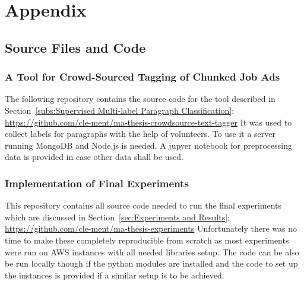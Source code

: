 
\renewcommand{\theequation}{B\arabic{equation}}
\setcounter{equation}{0}
\renewcommand{\thefigure}{B\arabic{figure}}
\setcounter{figure}{0}
\renewcommand{\thetable}{B\arabic{table}}
\setcounter{table}{0}


\clearpage

\thesisappendix

\section{Appendix}

\subsection{Source Files and Code}

\subsubsection*{A Tool for Crowd-Sourced Tagging of Chunked Job Ads}
\label{sub:A Tool for Crowd-Sourced Tagging of Chunked Job Ads}

The following repository contains the source code for the tool described in Section~\ref{subs:Supervised Multi-label Paragraph Classification}: \url{https://github.com/cle-ment/ma-thesis-crowdsource-text-tagger}
It was used to collect labels for paragraphs with the help of volunteers. To use it a server running \gls{MongoDB} and \gls{Node.js} is needed. A jupyer notebook for preprocessing data is provided in case other data shall be used.

\subsubsection*{Implementation of Final Experiments}
\label{sub:Implementation of Final Experiments}

This repository contains all source code needed to run the final experiments which are discussed in Section~\ref{sec:Experiments and Results}: \url{https://github.com/cle-ment/ma-thesis-experiments}
Unfortunately there was no time to make these completely reproducible from scratch as most experiments were run on \gls{AWS} instances with all needed libraries setup. The code can be also be run locally though if the python modules are installed and the code to set up the instances is provided if a similar setup is to be achieved.

